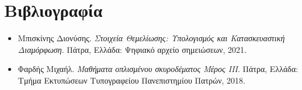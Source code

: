 \pagestyle{plain}
\chapter*{Βιβλιογραφία}
\renewcommand{\labelitemi}{$\blacksquare$}
\begin{itemize}
  \item Μπισκίνης Διονύσης. \emph{Στοιχεία Θεμελίωσης: Υπολογισμός και Κατασκευαστική Διαμόρφωση}. Πάτρα, Ελλάδα: Ψηφιακό αρχείο σημειώσεων, 2021.
  \item Φαρδής Μιχαήλ. \emph{Μαθήματα οπλισμένου σκυροδέματος Μέρος ΙΙΙ}. Πάτρα, Ελλάδα: Τμήμα Εκτυπώσεων Τυπογραφείου Πανεπιστημίου Πατρών, 2018.
\end{itemize}
